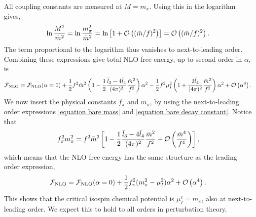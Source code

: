 All coupling constants are measured at $M = m_\pi$.
Using this in the logarithm gives,
\begin{equation}
    \ln \frac{M^2}{\bar m^2}
    = \ln \frac{m_\pi^2}{\bar m^2}
    = \ln \left[1 + \Oh[2]{(\bar m/f)} \right]
    = \Oh[2]{(\bar m/f)}.
\end{equation}
The term proportional to the logarithm thus vanishes to next-to-leading order.
Combining these expressions give total NLO free energy, up to second order in $\alpha$, is
\begin{equation}
    \Ef_{\mathrm{NLO}}
    =
    \Ef_{\mathrm{NLO}}(\alpha = 0)
    +
    \frac{1}{2} f^2 \bar m^2
    \left(
        1
        -
        \frac{1}{2}
        \frac{\bar l_3 - 4 \bar l_4}{(4 \pi)^2} \frac{\bar m^2}{f^2}
    \right)\alpha^2
    - \frac{1}{2}f^2 \mu_I^2
    \left(
        1
        +
        \frac{2 \bar l_4}{(4 \pi)^2}
        \frac{\bar m^2}{f^2}
    \right) \alpha^2
    + \Oh[4]{\alpha}.
\end{equation}
We now insert the physical constants $f_\pi$ and $m_\pi$, by using the next-to-leading order expressions \cref{equation bare mass} and \cref{equation bare decay constant}.
Notice that
\begin{equation}
    f_\pi^2 m_\pi^2
    = f^2 \bar m^2
    \left[
        1 - \frac{1}{2} \frac{\bar l_3 - 4 \bar l_4}{(4 \pi)^2} \frac{\bar m^2}{f^2}
        +
        \Oh[]{\frac{\bar m^4}{f^4}}
    \right],
\end{equation}
which means that the NLO free energy has the same structure as the leading order expression,
\begin{equation}
    \Ef_{\mathrm{NLO}}
    =
    \Ef_{\mathrm{NLO}}(\alpha = 0)
    + \frac{1}{2}f_\pi^2 (m_\pi^2 - \mu_I^2 )\alpha^2
    + \Oh[4]{\alpha}.
\end{equation}
This shows that the critical isospin chemical potential is $\mu_I^c = m_\pi$, also at next-to-leading order.
We expect this to hold to all orders in perturbation theory.
